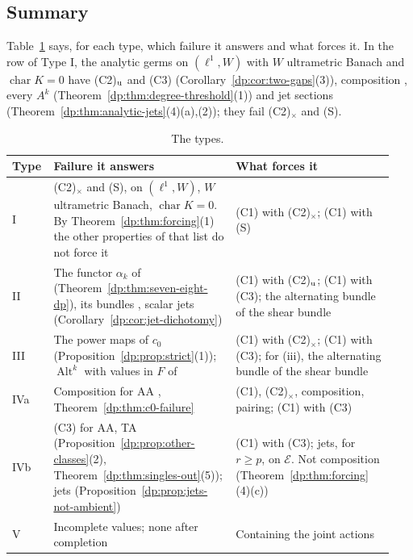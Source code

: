 \documentclass[11pt]{amsart}
\theoremstyle{definition}
\theoremstyle{remark}
\numberwithin{equation}{section}
\newcommand{\Alt}{\operatorname{Alt}}
\theoremstyle{plain}
\theoremstyle{definition}
\theoremstyle{plain}
\begin{document}
\subsection{Summary}\label{dp:ssec:summary}

Table~\ref{dp:tab:types} says, for each type, which failure it answers and what forces it. In the row of Type I, the analytic germs on $(\ell^1,W)$ with $W$ ultrametric Banach and $\operatorname{char}K=0$ have (C2)$_{\rm u}$ and (C3) (Corollary~\ref{dp:cor:two-gaps}(3)), composition \cite[Proposition~14.26, proof, Step~1]{I}, every $A^k$ (Theorem~\ref{dp:thm:degree-threshold}(1)) and jet sections (Theorem~\ref{dp:thm:analytic-jets}(4)(a),(2)); they fail (C2)$_\times$ and (S).

\begin{table}[htbp]
\small
\caption{The types.}\label{dp:tab:types}
\begin{tabular}{@{}p{0.08\linewidth}p{0.46\linewidth}p{0.4\linewidth}@{}}
Type & Failure it answers & What forces it\\
\hline
I & (C2)$_\times$ and (S), on $(\ell^1,W)$, $W$ ultrametric Banach, $\operatorname{char}K=0$. By Theorem~\ref{dp:thm:forcing}(1) the other properties of that list do not force it & (C1) with (C2)$_\times$; (C1) with (S)\\
II & The functor $\alpha_k$ of~\cite[n\textsuperscript{o}~7.8.1]{Bou} (Theorem~\ref{dp:thm:seven-eight-dp}), its bundles \cite[Corollary~10.2]{I}, scalar jets (Corollary~\ref{dp:cor:jet-dichotomy}) & (C1) with (C2)$_{\rm u}$; (C1) with (C3); the alternating bundle of the shear bundle\\
III & The power maps of $c_0$ (Proposition~\ref{dp:prop:strict}(1)); $\Alt^k$ with values in $F$ of \cite[Theorem~7.2(1)]{I} & (C1) with (C2)$_\times$; (C1) with (C3); for (iii), the alternating bundle of the shear bundle\\
IVa & Composition for AA \cite[Theorem~14.17]{I}, Theorem~\ref{dp:thm:c0-failure} & (C1), (C2)$_\times$, composition, pairing; (C1) with (C3)\\
IVb & (C3) for AA, TA (Proposition~\ref{dp:prop:other-classes}(2), Theorem~\ref{dp:thm:singles-out}(5)); jets (Proposition~\ref{dp:prop:jets-not-ambient}) & (C1) with (C3); jets, for $r\ge p$, on $\mathcal E$. Not composition (Theorem~\ref{dp:thm:forcing}(4)(c))\\
V & Incomplete values; none after completion & Containing the joint actions\\
\end{tabular}
\end{table}
\end{document}
